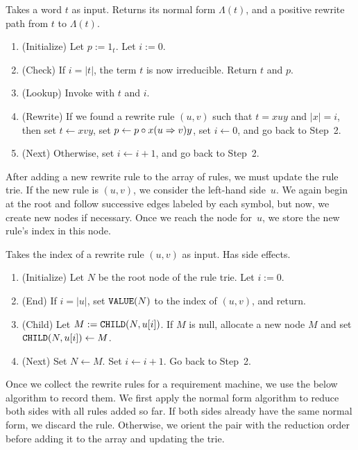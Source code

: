 \documentclass[../generics]{subfiles}
\begin{document}
\begin{algorithm}\label{alg:trie normal form}
Takes a word $t$ as input. Returns its normal form $\Lambda(t)$, and a positive rewrite path from $t$ to $\Lambda(t)$.
\begin{enumerate}
\item (Initialize) Let $p := 1_t$. Let $i := 0$.
\item (Check) If $i=|t|$, the term $t$ is now irreducible. Return $t$ and $p$.
\item (Lookup) Invoke  with $t$ and $i$.
\item (Rewrite) If we found a rewrite rule $(u, v)$ such that $t=xuy$ and $|x|=i$, then set $t\leftarrow xvy$, set $p\leftarrow p\circ x(u\Rightarrow v)y$, set $i\leftarrow 0$, and go back to Step~2.
\item (Next) Otherwise, set $i\leftarrow i+1$, and go back to Step~2.
\end{enumerate}
\end{algorithm}

After adding a new rewrite rule to the array of rules, we must update the rule trie. If the new rule is $(u,v)$, we consider the left-hand side~$u$. We again begin at the root and follow successive edges labeled by each symbol, but now, we create new nodes if necessary. Once we reach the node for~$u$, we store the new rule's index in this node.

\begin{algorithm}\label{trie insert algo}
Takes the index of a rewrite rule $(u,v)$ as input. Has side effects.
\begin{enumerate}
\item (Initialize) Let $N$ be the root node of the rule trie. Let $i:=0$.
\item (End) If $i=|u|$, set $\texttt{VALUE}(N)$ to the index of $(u,v)$, and return.
\item (Child) Let $M:=\texttt{CHILD}(N,u[i])$. If $M$ is null, allocate a new node $M$ and set $\texttt{CHILD}(N,u[i])\leftarrow M$.
\item (Next) Set $N \leftarrow M$. Set $i \leftarrow i+1$. Go back to Step~2.
\end{enumerate}
\end{algorithm}

Once we collect the rewrite rules for a requirement machine, we use the below algorithm to record them. We first apply the normal form algorithm to reduce both sides with all rules added so far. If both sides already have the same normal form, we discard the rule. Otherwise, we orient the pair with the reduction order before adding it to the array and updating the trie.
\end{document}
